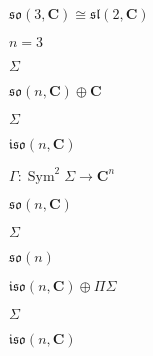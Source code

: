 \begin{preview}
\setcounter{equation}{0}%
\( \mathfrak{so}(3, \mathbf{C}) \cong \mathfrak{sl}(2, \mathbf{C}) \)
\end{preview}

\begin{preview}
\setcounter{equation}{0}%
\( n=3 \)
\end{preview}

\begin{preview}
\setcounter{equation}{0}%
\( \Sigma \)
\end{preview}

\begin{preview}
\setcounter{equation}{0}%
\( \mathfrak{so}(n, \mathbf{C})\oplus \mathbf{C} \)
\end{preview}

\begin{preview}
\setcounter{equation}{0}%
\( \Sigma \)
\end{preview}

\begin{preview}
\setcounter{equation}{0}%
\( \mathfrak{iso}(n, \mathbf{C}) \)
\end{preview}

\begin{preview}
\setcounter{equation}{0}%
\( \Gamma : \operatorname{Sym}^2 \Sigma \to \mathbf{C}^n \)
\end{preview}

\begin{preview}
\setcounter{equation}{0}%
\( \mathfrak{so}(n , \mathbf{C}) \)
\end{preview}

\begin{preview}
\setcounter{equation}{0}%
\( \Sigma \)
\end{preview}

\begin{preview}
\setcounter{equation}{0}%
\(\mathfrak{so}(n)\)
\end{preview}

\begin{preview}
\setcounter{equation}{0}%
\( \mathfrak{iso}(n , \mathbf{C}) \oplus \Pi \Sigma \)
\end{preview}

\begin{preview}
\setcounter{equation}{0}%
\( \Sigma \)
\end{preview}

\begin{preview}
\setcounter{equation}{0}%
\( \mathfrak{iso}(n , \mathbf{C}) \)
\end{preview}

